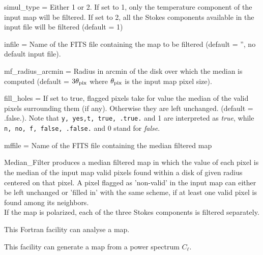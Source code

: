 \begin{qualifiers}
  \begin{qulistwide}{} %
%
    \item[{simul\_type = }] Either 1 or 2. If set to 1, only the temperature component of the
      input map will be filtered. If set to 2, all the Stokes components available
      in the input file will be filtered (default = 1)
%
    \item[{infile = }] Name of the FITS file containing the map to be filtered
      (default = '', no default input file).
%
    \item[{mf\_radius\_arcmin = }] Radius in arcmin of the disk over which the
      median is computed (default = $3\theta_{\rm pix}$ where $\theta_{\rm pix}$
      is the input map pixel size).
%
    \item[{fill\_holes = }] If set to true, flagged pixels take for value the median of
      the valid pixels surrounding them (if any). Otherwise they are left
      unchanged.
      (default = .false.). Note that {\tt y, yes,t, true, .true.} and 1 are
      interpreted as {\em true}, while {\tt n, no, f, false, .false.} and 0 stand
      for {\em false}.
%
    \item[{mffile = }] Name of the FITS file containing the median filtered map
%
  \end{qulistwide}
\end{qualifiers}

\begin{codedescription}
{%
Median\_Filter produces a median filtered map in which the value of each pixel
is the median of the input map valid pixels found within a disk of given
  radius centered on that pixel. A pixel flagged as 'non-valid' in the input map
  can either be left unchanged or 'filled in' with the same scheme, if at
  least one valid pixel is found among its neighbors. \\
If the map is polarized, each of the three Stokes components is filtered separately.
}
\end{codedescription}

\begin{support}
  \begin{sulist}{} %
  \item[\htmlref{anafast}{fac:anafast}] This \healpix Fortran facility can
     	       analyse a \healpix map.
  \item[\htmlref{synfast}{fac:synfast}] This \healpix facility can generate a
  \healpix map from a power spectrum $C_\ell$.
		
  \end{sulist}
\end{support}

